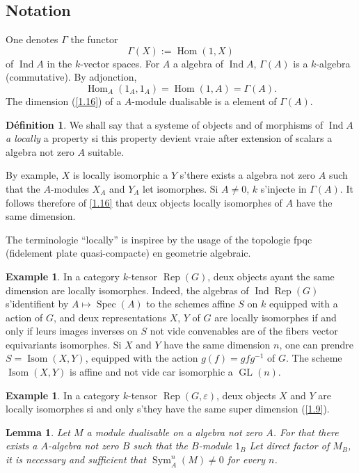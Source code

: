 \documentclass[11pt,a4paper]{article}
\theoremstyle{plain}
\newtheorem{lemma}[theorem]{Lemma}
\theoremstyle{definition}
\newtheorem{definition}[theorem]{D\'efinition}
\newtheorem{example}[theorem]{Example}
\DeclareMathOperator{\Hom}{Hom}
\DeclareMathOperator{\Spec}{Spec}
\DeclareMathOperator{\Sym}{Sym}
\DeclareMathOperator{\Ind}{Ind}
\DeclareMathOperator{\GL}{GL}
\newcommand{\Rep}{\operatorname{Rep}}
\newcommand{\Isom}{\operatorname{Isom}}
\begin{document}
\subsection{Notation}\label{2.4}

One denotes $\Gamma$ the functor
\[
\Gamma(X):=\Hom(1,X)
\]
of $\Ind A$ in the $k$-vector spaces. For $A$ a algebra of $\Ind A$, $\Gamma(A)$ is a $k$-algebra (commutative). By adjonction,
\[
\Hom_A(1_A,1_A)=\Hom(1,A)=\Gamma(A).
\]
The dimension (\ref{1.16}) of a $A$-module dualisable is a element of $\Gamma(A)$.

\begin{definition}\label{2.5}
We shall say that a systeme of objects and of morphisms of $\Ind A$ \emph{a locally} a property si this property devient vraie after extension of scalars a algebra not zero $A$ suitable.
\end{definition}

By example, $X$ is locally isomorphic a $Y$ s'there exists a algebra not zero $A$ such that the $A$-modules $X_A$ and $Y_A$ let isomorphes. Si $A\neq0$, $k$ s'injecte in $\Gamma(A)$. It follows therefore of \ref{1.16} that deux objects locally isomorphes of $A$ have the same dimension.

The terminologie ``locally'' is inspiree by the usage of the topologie fpqc (fidelement plate quasi-compacte) en geometrie algebraic.

\begin{example}\label{2.6}
In a category $k$-tensor $\Rep(G)$, deux objects ayant the same dimension are locally isomorphes. Indeed, the algebras of $\Ind\Rep(G)$ s'identifient by $A\mapsto\Spec(A)$ to the schemes affine $S$ on $k$ equipped with a action of $G$, and deux representations $X$, $Y$ of $G$ are locally isomorphes if and only if leurs images inverses on $S$ not vide convenables are of the fibers vector equivariants isomorphes. Si $X$ and $Y$ have the same dimension $n$, one can prendre $S=\Isom(X,Y)$, equipped with the action $g(f)=gfg^{-1}$ of $G$. The scheme $\Isom(X,Y)$ is affine and not vide car isomorphic a $\GL(n)$.
\end{example}

\begin{example}\label{2.7}
In a category $k$-tensor $\Rep(G,\varepsilon)$, deux objects $X$ and $Y$ are locally isomorphes si and only s'they have the same super dimension (\ref{1.9}).
\end{example}

\begin{lemma}\label{2.8}
Let $M$ a module dualisable on a algebra not zero $A$. For that there exists a $A$-algebra not zero $B$ such that the $B$-module $1_B$ Let direct factor of $M_B$, it is necessary and sufficient that $\Sym^n_A(M)\neq0$ for every $n$.
\end{lemma}
\end{document}
